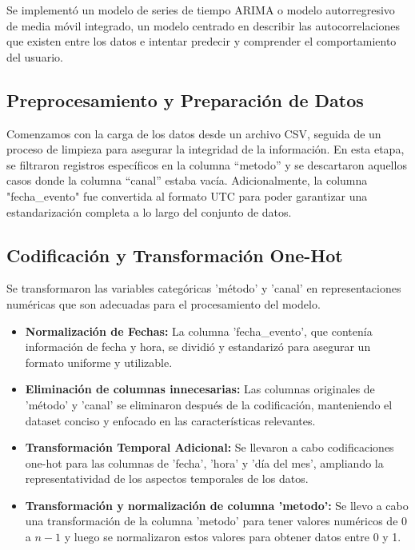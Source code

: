 Se implementó un modelo de series de tiempo ARIMA o modelo autorregresivo de media móvil integrado, un modelo centrado en describir las autocorrelaciones que existen entre los datos e intentar predecir y comprender el comportamiento del usuario.

\subsection{Preprocesamiento y Preparación de Datos}

Comenzamos con la carga de los datos desde un archivo CSV, seguida de un proceso de limpieza para asegurar la integridad de la información. En esta etapa, se filtraron registros específicos en la columna “metodo” y se descartaron aquellos casos donde la columna “canal” estaba vacía. Adicionalmente, la columna "fecha\_evento" fue convertida al formato UTC para poder garantizar una estandarización completa a lo largo del conjunto de datos.

\subsection{Codificación y Transformación One-Hot}

Se transformaron las variables categóricas 'método' y 'canal' en representaciones numéricas que son adecuadas para el procesamiento del modelo.

\begin{itemize}
    \item \textbf{Normalización de Fechas:} La columna 'fecha\_evento', que contenía información de fecha y hora, se dividió y estandarizó para asegurar un formato uniforme y utilizable.
    \item \textbf{Eliminación de columnas innecesarias:} Las columnas originales de 'método' y 'canal' se eliminaron después de la codificación, manteniendo el dataset conciso y enfocado en las características relevantes.
    \item \textbf{Transformación Temporal Adicional:} Se llevaron a cabo codificaciones one-hot para las columnas de 'fecha', 'hora' y 'día del mes', ampliando la representatividad de los aspectos temporales de los datos.
    \item \textbf{Transformación y normalización de columna 'metodo':} Se llevo a cabo una transformación de la columna 'metodo' para tener valores numéricos de 0 a $n-1$ y luego se normalizaron estos valores para obtener datos entre 0 y 1. 
\end{itemize}

